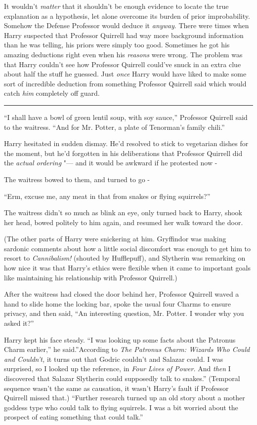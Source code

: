 It wouldn't \emph{matter} that it shouldn't be enough evidence to locate
the true explanation as a hypothesis, let alone overcome its burden of
prior improbability. Somehow the Defense Professor would deduce it
\emph{anyway}. There were times when Harry suspected that Professor
Quirrell had way more background information than he was telling, his
priors were simply too good. Sometimes he got his amazing deductions
right even when his \emph{reasons} were wrong. The problem was that
Harry couldn't see how Professor Quirrell could've snuck in an extra
clue about half the stuff he guessed. Just \emph{once} Harry would have
liked to make some sort of incredible deduction from something Professor
Quirrell said which would catch \emph{him} completely off guard.

\begin{center}\rule{3in}{0.4pt}\end{center}

``I shall have a bowl of green lentil soup, with soy sauce,'' Professor
Quirrell said to the waitress. ``And for Mr. Potter, a plate of
Tenorman's family chili.''

Harry hesitated in sudden dismay. He'd resolved to stick to vegetarian
dishes for the moment, but he'd forgotten in his deliberations that
Professor Quirrell did the \emph{actual ordering} "--- and it would be
awkward if he protested now -

The waitress bowed to them, and turned to go -

``Erm, excuse me, any meat in that from snakes or flying squirrels?''

The waitress didn't so much as blink an eye, only turned back to Harry,
shook her head, bowed politely to him again, and resumed her walk toward
the door.

(The other parts of Harry were snickering at him. Gryffindor was making
sardonic comments about how a little social discomfort was enough to get
him to resort to \emph{Cannibalism!} (shouted by Hufflepuff), and
Slytherin was remarking on how nice it was that Harry's ethics were
flexible when it came to important goals like maintaining his
relationship with Professor Quirrell.)

After the waitress had closed the door behind her, Professor Quirrell
waved a hand to slide home the locking bar, spoke the usual four Charms
to ensure privacy, and then said, ``An interesting question, Mr. Potter.
I wonder why you asked it?''

Harry kept his face steady. ``I was looking up some facts about the
Patronus Charm earlier,'' he said.''According to \emph{The Patronus
Charm: Wizards Who Could and Couldn't,} it turns out that Godric
couldn't and Salazar could. I was surprised, so I looked up the
reference, in \emph{Four Lives of Power.} And \emph{then} I discovered
that Salazar Slytherin could supposedly talk to snakes.'' (Temporal
sequence wasn't the same as causation, it wasn't Harry's fault if
Professor Quirrell missed that.) ``Further research turned up an old
story about a mother goddess type who could talk to flying squirrels. I
was a bit worried about the prospect of eating something that could
talk.''

